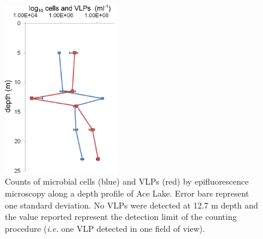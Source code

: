 \begin{figure}
\centering
\includegraphics[width=50mm]{ace_figures/ace_counts.pdf}
\caption[Counts of microbial cells and \acs{VLP}s in Ace Lake]{Counts of microbial cells (blue) and \acs{VLP}s (red) by epifluorescence microscopy along a depth profile of Ace Lake.
Error bars represent one standard deviation.
No \acp{VLP} were detected at 12.7 m depth and the value reported represent the detection limit of the counting procedure (\emph{i.e.} one \acs{VLP} detected in one field of view).
}
\label{fig:ace_counts}

\end{figure}
